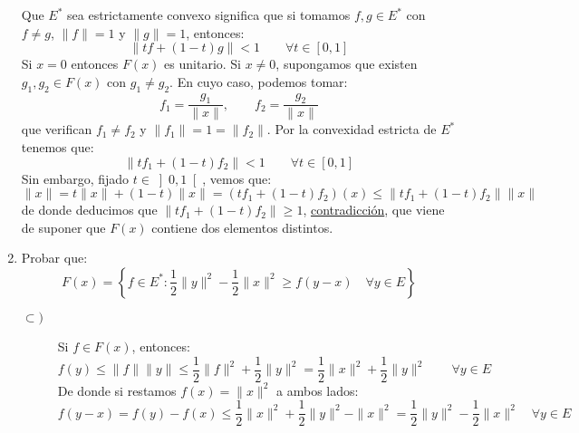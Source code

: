 \begin{ejercicio}
\begin{enumerate}[label=\alph*)]
            Que $E^\ast$ sea estrictamente convexo significa que si tomamos $f,g\in E^\ast$ con $f\neq g$, $\|f\| = 1$ y $\|g\| = 1$, entonces:
            \begin{equation*}
                \|tf + (1-t)g\| < 1 \qquad \forall t\in [0,1]
            \end{equation*}
            Si $x=0$ entonces $F(x)$ es unitario. Si $x\neq 0$, supongamos que existen $g_1,g_2\in F(x)$ con $g_1\neq g_2$. En cuyo caso, podemos tomar:
            \begin{equation*}
                f_1 = \dfrac{g_1}{\|x\|}, \qquad f_2 = \dfrac{g_2}{\|x\|}
            \end{equation*}
            que verifican $f_1\neq f_2$ y $\|f_1\| = 1 = \|f_2\|$. Por la convexidad estricta de $E^\ast$ tenemos que:
            \begin{equation*}
                \|tf_1 + (1-t)f_2\| < 1 \qquad \forall t\in [0,1]
            \end{equation*}
            Sin embargo, fijado $t\in \left]0,1\right[$, vemos que:
            \begin{equation*}
                \|x\| = t\|x\| + (1-t)\|x\| = (tf_1+(1-t)f_2)(x) \leq \|tf_1+(1-t)f_2\|\|x\|
            \end{equation*}
            de donde deducimos que $\|tf_1 + (1-t)f_2\|\geq 1$, \underline{contradicción}, que viene de suponer que $F(x)$ contiene dos elementos distintos.
        \item Probar que:
            \begin{equation*}
                F(x) = \left\{f\in E^\ast : \dfrac{1}{2}\|y\|^2 - \dfrac{1}{2}\|x\|^2 \geq f(y-x)\quad \forall y\in E\right\}
            \end{equation*}
            \begin{description}
                \item [$\subset )$] Si $f\in F(x)$, entonces:
                    \begin{equation*}
                        f(y) \leq \|f\|\|y\| \leq \dfrac{1}{2}\|f\|^2 + \dfrac{1}{2}\|y\|^2 = \dfrac{1}{2}\|x\|^2 + \dfrac{1}{2}\|y\|^2 \qquad \forall y\in E
                    \end{equation*}
                    De donde si restamos $f(x) = \|x\|^2$ a ambos lados:
                    \begin{equation*}
                        f(y-x) = f(y) - f(x)\leq \dfrac{1}{2} \|x\|^2 + \dfrac{1}{2}\|y\|^2 - \|x\|^2 = \dfrac{1}{2}\|y\|^2 - \dfrac{1}{2}\|x\|^2 \quad \forall y\in E

\end{equation*}
\end{description}
\end{enumerate}
\end{ejercicio}

